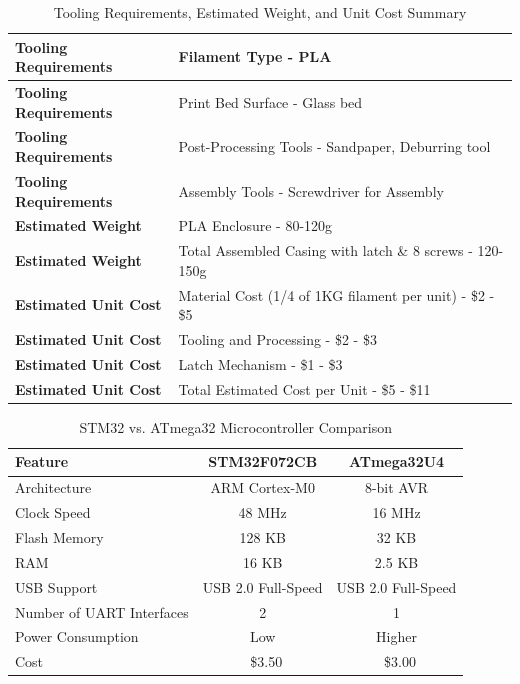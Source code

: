 \documentclass[12pt]{article}
\begin{document}
\begin{table}[h!]
\centering
\begin{tabular}{|l|l|}
\hline
\textbf{Tooling Requirements} & Filament Type - PLA \\ \hline
\textbf{Tooling Requirements} & Print Bed Surface - Glass bed \\ \hline
\textbf{Tooling Requirements} & Post-Processing Tools - Sandpaper, Deburring tool \\ \hline
\textbf{Tooling Requirements} & Assembly Tools - Screwdriver for Assembly \\ \hline
\textbf{Estimated Weight} & PLA Enclosure - 80-120g \\ \hline
\textbf{Estimated Weight} & Total Assembled Casing with latch \& 8 screws - 120-150g \\ \hline
\textbf{Estimated Unit Cost} & Material Cost (1/4 of 1KG filament per unit) - \$2 - \$5 \\ \hline
\textbf{Estimated Unit Cost} & Tooling and Processing - \$2 - \$3 \\ \hline
\textbf{Estimated Unit Cost} & Latch Mechanism - \$1 - \$3 \\ \hline
\textbf{Estimated Unit Cost} & Total Estimated Cost per Unit - \$5 - \$11 \\ \hline
\end{tabular}
\caption{Tooling Requirements, Estimated Weight, and Unit Cost Summary}
\label{tooling_costs}
\end{table}

\begin{table}[H]
\centering
\begin{tabular}{|l|c|c|}
\hline
\textbf{Feature} & \textbf{STM32F072CB} & \textbf{ATmega32U4} \\
\hline
Architecture & ARM Cortex-M0 & 8-bit AVR \\
Clock Speed & 48 MHz & 16 MHz \\
Flash Memory & 128 KB & 32 KB \\
RAM & 16 KB & 2.5 KB \\
USB Support & USB 2.0 Full-Speed & USB 2.0 Full-Speed \\
Number of UART Interfaces & 2 & 1 \\
Power Consumption & Low & Higher \\
Cost & ~\$3.50 & ~\$3.00 \\
\hline
\end{tabular}
\caption{STM32 vs. ATmega32 Microcontroller Comparison}
\label{stm32_vs_atmega}
\end{table}
\end{document}
